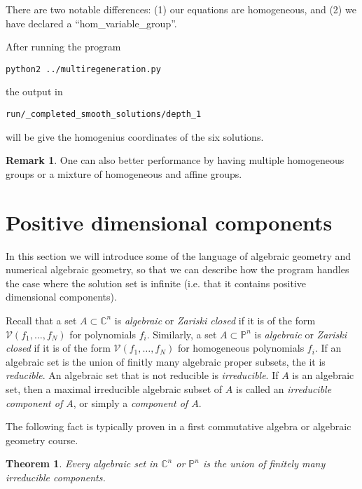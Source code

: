 \documentclass[12pt]{article}
\newtheorem{theorem}{Theorem}[section]
\theoremstyle{definition}
\newtheorem{remark}{Remark}[section]
\newcommand{\C}{\mathbb{C}}
\newcommand{\PP}{\mathbb{P}}
\begin{document}
There are two notable differences: (1) our equations are homogeneous, and 
(2) we have declared a ``hom\_variable\_group''.

\noindent After running the program
\begin{leftbar}
\vspace{-10pt} 
\begin{verbatim}
python2 ../multiregeneration.py
\end{verbatim}\vspace{-10pt} 
\end{leftbar}
\noindent the output in
\begin{leftbar}
\vspace{-10pt} 
\begin{verbatim}
run/_completed_smooth_solutions/depth_1
\end{verbatim}\vspace{-10pt} 
\end{leftbar}
\noindent will be give the homogenius coordinates of the six 
solutions.

\begin{remark}
One can also better performance by having multiple homogeneous groups or a mixture of homogeneous and affine groups. 
\end{remark}

\section{Positive dimensional components}
In this section we will introduce some of the language of 
algebraic geometry and numerical algebraic geometry, so that we can 
describe how the program handles the case where the solution set is 
infinite (i.e. that it contains positive dimensional components).

Recall that a set $A \subset \C^n$ is \emph{algebraic} or \emph{Zariski 
closed} if it is of the form $\mathcal{V}(f_1, \ldots, f_N)$ for 
polynomials $f_i$. Similarly, a set $A \subset \PP^n$ is 
\emph{algebraic} or \emph{Zariski closed} if it is of the form 
$\mathcal{V}(f_1, \ldots, f_N)$ for 
homogeneous polynomials $f_i$. If an algebraic set is the union of 
finitly many algebraic proper subsets, the it is \emph{reducible}. An 
algebraic set that is not reducible is \emph{irreducible}. If $A$ is an 
algebraic set, then a maximal irreducible algebraic subset of $A$ 
is called an \emph{irreducible component of $A$}, or simply a 
\emph{component of $A$}.

The following fact is typically proven in a first commutative algebra or 
algebraic geometry course.
\begin{theorem}
   Every algebraic set in $\C^n$ or $\PP^n$ is the union of finitely 
   many irreducible components.
\end{theorem}
\end{document}
